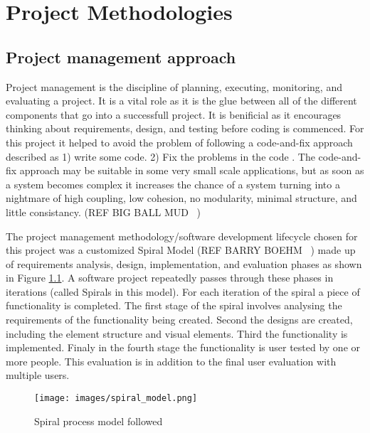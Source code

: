 
\chapter{Project Methodologies}\label{C:m}

\section{Project management approach}
Project management is the discipline of planning, executing, monitoring, and
evaluating a project. It is a vital role as it is the glue between all of the
different components that go into a successfull project. It is benificial as it
encourages thinking about requirements, design, and testing before coding is
commenced. For this project it helped to avoid the problem of following a
code-and-fix approach described  as 1) write some code. 2) Fix the problems in
the code \cite{boehm}. The code-and-fix approach may be suitable in some very
small scale applications, but as soon as a system becomes complex it increases
the chance of a system turning into a nightmare of high coupling, low cohesion,
no modularity, minimal structure, and little consistancy. (REF BIG BALL MUD ~)

The project management methodology/software development lifecycle chosen for
this project was a customized Spiral Model (REF BARRY BOEHM ~) made up of
requirements analysis, design, implementation, and evaluation phases as shown in
Figure \ref{fig:spiralModel}. 
A software project repeatedly passes through these phases in iterations (called
Spirals in this model). For each iteration of the spiral a piece of
functionality is completed. The first stage of the spiral involves analysing the
requirements of the functionality being created. Second the designs are created,
including the element structure and visual elements. Third the functionality is
implemented. Finaly in the fourth stage the functionality is user tested by one
or more people. This evaluation is in addition to the final user evaluation with
multiple users. 

\begin{figure}[h!]
  \centering
      \texttt{[image: images/spiral\_model.png]}
  \caption{Spiral process model followed}
  \label{fig:spiralModel}
\end{figure}

